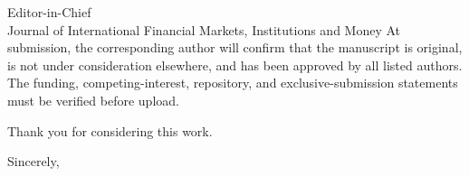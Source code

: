 \documentclass[10pt,a4paper]{letter}
\begin{document}
\begin{letter}{Editor-in-Chief\\Journal of International Financial Markets, Institutions and Money}
At submission, the corresponding author will confirm that the manuscript is original, is not under consideration elsewhere, and has been approved by all listed authors. The funding, competing-interest, repository, and exclusive-submission statements must be verified before upload.

Thank you for considering this work.

\closing{Sincerely,}
\end{letter}
\end{document}
